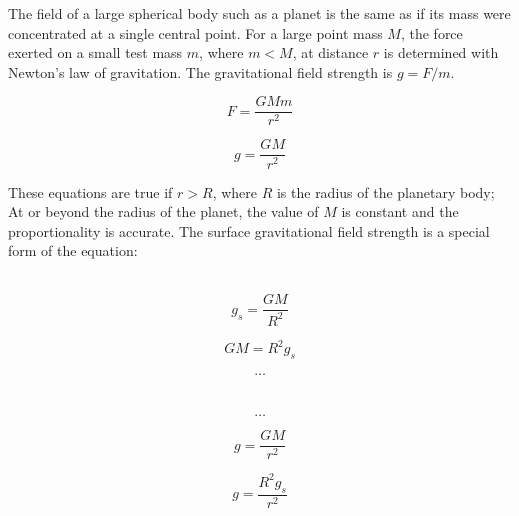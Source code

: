 \documentclass[12pt]{article}
\begin{document}
The field of a large spherical body such as a planet is the same as if its mass were concentrated at a single central point. For a large point mass \(M\), the force exerted on a small test mass \(m\), where \(m < M\), at distance \(r\) is determined with Newton's law of gravitation. The gravitational field strength is \(g = F / m\).

\begin{figure}[H]
\centering
\begin{minipage}{.8\textwidth}
\begin{tcolorbox}[
sharp corners=all,
colback=white,
colframe=white,
size=tight,
boxrule=0.2mm,
left=10mm, right=10mm
]
\begin{multicols}{2}
\[F = \dfrac{GMm}{r^2}\]

\columnbreak

\[g = \dfrac{GM}{r^2}\]
\end{multicols}
\end{tcolorbox}
\end{minipage}
\end{figure}

These equations are true if \(r > R\), where \(R\) is the radius of the planetary body; At or beyond the radius of the planet, the value of \(M\) is constant and the proportionality is accurate. The surface gravitational field strength is a special form of the equation:


\begin{figure}[H]
\centering
\begin{minipage}{.8\textwidth}
\begin{tcolorbox}[
sharp corners=all,
colback=white,
colframe=white,
size=tight,
boxrule=0.2mm,
left=10mm, right=10mm
]
\begin{multicols}{2}
\noindent
\\
\[g_s = \dfrac{GM}{R^2}\]

\[GM = R^2g_s \]

\[\textbf{\ldots}\]
\\
\columnbreak
\\
\[\textbf{\ldots}\]

\[g = \dfrac{GM}{r^2}\]

\[g = \dfrac{R^2g_s}{r^2}\]
\\

\end{multicols}
\end{tcolorbox}
\end{minipage}
\end{figure}
\end{document}
